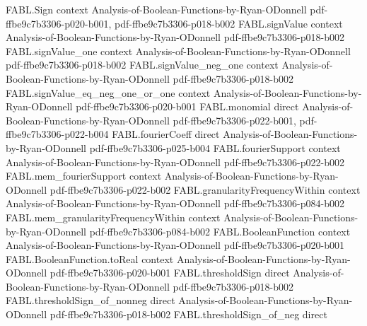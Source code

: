 \begin{theorem}
\label{FABL.abs_sum_fourierCoeff_singleton_le_majority}
\leanok
{}
\proofstep
  {FABL.Sign}
  {context}
  {Analysis-of-Boolean-Functions-by-Ryan-ODonnell}
  {pdf-ffbe9c7b3306-p020-b001,
    pdf-ffbe9c7b3306-p018-b002}
\proofstep
  {FABL.signValue}
  {context}
  {Analysis-of-Boolean-Functions-by-Ryan-ODonnell}
  {pdf-ffbe9c7b3306-p018-b002}
\proofstep
  {FABL.signValue_one}
  {context}
  {Analysis-of-Boolean-Functions-by-Ryan-ODonnell}
  {pdf-ffbe9c7b3306-p018-b002}
\proofstep
  {FABL.signValue_neg_one}
  {context}
  {Analysis-of-Boolean-Functions-by-Ryan-ODonnell}
  {pdf-ffbe9c7b3306-p018-b002}
\proofstep
  {FABL.signValue_eq_neg_one_or_one}
  {context}
  {Analysis-of-Boolean-Functions-by-Ryan-ODonnell}
  {pdf-ffbe9c7b3306-p020-b001}
\proofstep
  {FABL.monomial}
  {direct}
  {Analysis-of-Boolean-Functions-by-Ryan-ODonnell}
  {pdf-ffbe9c7b3306-p022-b001,
    pdf-ffbe9c7b3306-p022-b004}
\proofstep
  {FABL.fourierCoeff}
  {direct}
  {Analysis-of-Boolean-Functions-by-Ryan-ODonnell}
  {pdf-ffbe9c7b3306-p025-b004}
\proofstep
  {FABL.fourierSupport}
  {context}
  {Analysis-of-Boolean-Functions-by-Ryan-ODonnell}
  {pdf-ffbe9c7b3306-p022-b002}
\proofstep
  {FABL.mem_fourierSupport}
  {context}
  {Analysis-of-Boolean-Functions-by-Ryan-ODonnell}
  {pdf-ffbe9c7b3306-p022-b002}
\proofstep
  {FABL.granularityFrequencyWithin}
  {context}
  {Analysis-of-Boolean-Functions-by-Ryan-ODonnell}
  {pdf-ffbe9c7b3306-p084-b002}
\proofstep
  {FABL.mem_granularityFrequencyWithin}
  {context}
  {Analysis-of-Boolean-Functions-by-Ryan-ODonnell}
  {pdf-ffbe9c7b3306-p084-b002}
\proofstep
  {FABL.BooleanFunction}
  {context}
  {Analysis-of-Boolean-Functions-by-Ryan-ODonnell}
  {pdf-ffbe9c7b3306-p020-b001}
\proofstep
  {FABL.BooleanFunction.toReal}
  {context}
  {Analysis-of-Boolean-Functions-by-Ryan-ODonnell}
  {pdf-ffbe9c7b3306-p020-b001}
\proofstep
  {FABL.thresholdSign}
  {direct}
  {Analysis-of-Boolean-Functions-by-Ryan-ODonnell}
  {pdf-ffbe9c7b3306-p018-b002}
\proofstep
  {FABL.thresholdSign_of_nonneg}
  {direct}
  {Analysis-of-Boolean-Functions-by-Ryan-ODonnell}
  {pdf-ffbe9c7b3306-p018-b002}
\proofstep
  {FABL.thresholdSign_of_neg}
  {direct}

\end{theorem}
